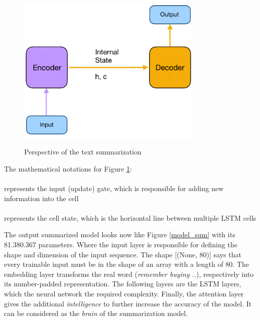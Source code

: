 \begin{figure}
	\begin{center}
		\includegraphics[width=3.5in]{photos/modelenc-1}\\
		\caption{Perspective of the text summarization}\label{modelenc}
	\end{center}
\end{figure}

\begin{tcolorbox}
	The mathematical notations for Figure \ref{modelenc}: \\ \\
	 represents the input (update) gate, which is responsible for adding new information into the cell \\ \\
	 represents the cell state, which is the horizontal line between multiple LSTM cells
\end{tcolorbox}

The output summarized model looks now like Figure \ref{model_sum} with its 81.380.367 parameters. Where the input layer is responsible for defining the shape and dimension of the input sequence. The shape [(None, 80)] says that every trainable input must be in the shape of an array with a length of 80. The embedding layer transforms the real word (\textit{remember buying ..}), respectively into its number-padded representation. The following layers are the LSTM layers, which the neural network the required complexity. Finally, the attention layer gives the additional \textit{intelligence} to further increase the accuracy of the model. It can be considered as the \textit{brain} of the summarization model. \\

